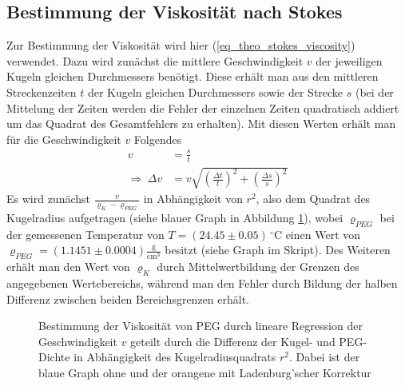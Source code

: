\documentclass[12pt,a4paper,german]{scrartcl}
\numberwithin{equation}{section}
\begin{document}
  \subsection{Bestimmung der Viskosität nach Stokes}
  Zur Bestimmung der Viskosität wird hier (\ref{eq_theo_stokes_viscosity}) verwendet.
  Dazu wird zunächst die mittlere Geschwindigkeit $v$ der jeweiligen Kugeln gleichen Durchmessers benötigt.
  Diese erhält man aus den mittleren Streckenzeiten $t$ der Kugeln gleichen Durchmessers sowie der Strecke $s$ (bei der Mittelung der Zeiten werden die Fehler der einzelnen Zeiten quadratisch addiert um das Quadrat des Gesamtfehlers zu erhalten).
  Mit diesen Werten erhält man für die Geschwindigkeit $v$ Folgendes
  \begin{align}
    v &= \frac{s}{t} \nonumber \\
    \Rightarrow \ \Delta v &= v \sqrt{\left(\frac{\Delta t}{t}\right)^2 + \left(\frac{\Delta s}{s}\right)^2}
  \end{align}
  Es wird zunächst $\frac{v}{\varrho_K - \varrho_{PEG}}$ in Abhängigkeit von $r^2$, also dem Quadrat des Kugelradius aufgetragen (siehe blauer Graph in Abbildung \ref{fig_stokes_viscosity_regression}), wobei $\varrho_{PEG}$ bei der gemessenen Temperatur von $T = (24.45 \pm 0.05) \, ^\circ$C einen Wert von $\varrho_{PEG} = (1.1451 \pm 0.0004) \frac{\text{g}}{\text{cm}^3}$ besitzt (siehe Graph im Skript). Des Weiteren erhält man den Wert von $\varrho_K$ durch Mittelwertbildung der Grenzen des angegebenen Wertebereichs, während man den Fehler durch Bildung der halben Differenz zwischen beiden Bereichsgrenzen erhält.

  \begin{figure}[h]
    \centering
    \resizebox{\textwidth}{!}{
      
    }
    \caption{Bestimmung der Viskosität von PEG durch lineare Regression der Geschwindigkeit $v$ geteilt durch die Differenz der Kugel- und PEG-Dichte in Abhängigkeit des Kugelradiusquadrats $r^2$. Dabei ist der blaue Graph ohne und der orangene mit Ladenburg'scher Korrektur}
    \label{fig_stokes_viscosity_regression}
  \end{figure}
\end{document}
